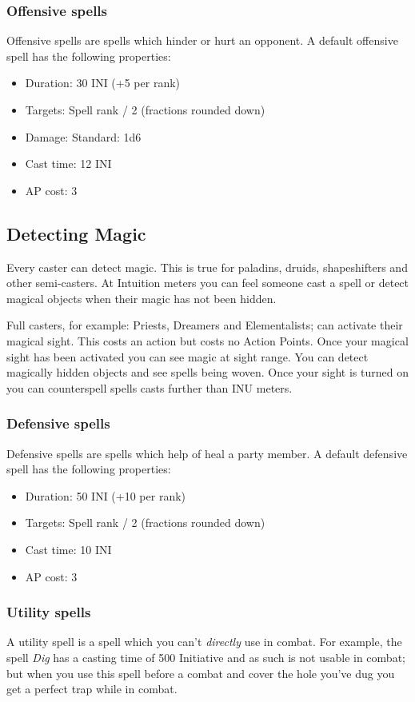 \subsubsection{Offensive spells}
Offensive spells are spells which hinder or hurt an opponent. A default offensive spell has the following properties:

\begin{itemize}
\item Duration: 30 INI (+5 per rank)
\item Targets: Spell rank / 2 (fractions rounded down)
\item Damage: Standard: 1d6
\item Cast time: 12 INI
\item AP cost: 3
\end{itemize}

\subsection{Detecting Magic}
Every caster can detect magic. This is true for paladins, druids, shapeshifters and other semi-casters. At Intuition meters you can feel someone cast a spell or detect magical objects when their magic has not been hidden.

Full casters, for example: Priests, Dreamers and Elementalists; can activate their magical sight. This costs an action but costs no Action Points. Once your magical sight has been activated you can see magic at sight range. You can detect magically hidden objects and see spells being woven. Once your sight is turned on you can counterspell spells casts further than INU meters.

\subsubsection{Defensive spells}
Defensive spells are spells which help of heal a party member. A default defensive spell has the following properties:

\begin{itemize}
\item Duration: 50 INI (+10 per rank)
\item Targets: Spell rank / 2 (fractions rounded down)
\item Cast time: 10 INI
\item AP cost: 3
\end{itemize}

\subsubsection{Utility spells}
A utility spell is a spell which you can't \emph{directly} use in combat. For example, the spell \emph{Dig} has a casting time of 500 Initiative and as such is not usable in combat; but when you use this spell before a combat and cover the hole you've dug you get a perfect trap while in combat.

